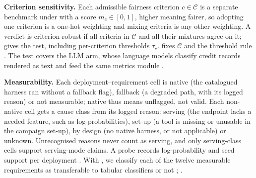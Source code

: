 \textbf{Criterion sensitivity.}
Each admissible fairness criterion $c \in \mathcal{C}$ is a separate benchmark under  with a score $m_c \in [0,1]$, higher meaning fairer, so adopting one criterion is a one-hot weighting and mixing criteria is any other weighting.
A verdict is criterion-robust if all criteria in $\mathcal{C}$ and all their mixtures agree on it;  gives the test, including per-criterion thresholds $\tau_c$.
\legalrisk{} fixes $\mathcal{C}$ and the threshold rule .
The test covers the LLM arm, whose language models classify credit records rendered as text and feed the same metrics module .

\textbf{Measurability.}
Each deployment--requirement cell is native (the catalogued harness ran without a fallback flag), fallback (a degraded path, with its logged reason) or not measurable; native thus means unflagged, not valid.
Each non-native cell gets a cause class from its logged reason: serving (the endpoint lacks a needed feature, such as log-probabilities), set-up (a tool is missing or unusable in the campaign set-up), by design (no native harness, or not applicable) or unknown.
Unrecognised reasons never count as serving, and only serving-class cells support serving-mode claims.
A probe records log-probability and seed support per deployment .
With \legalrisk{}, we classify each of the twelve measurable requirements as transferable to tabular classifiers or not ; .

